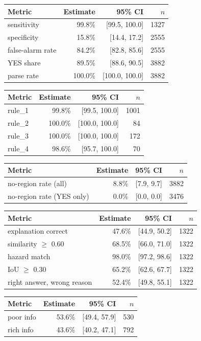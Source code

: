 \begin{tabular}{lrrr}
\toprule
Metric & Estimate & 95\% CI & $n$ \\
\midrule
sensitivity & 99.8\% & [99.5, 100.0] & 1327 \\
specificity & 15.8\% & [14.4, 17.2] & 2555 \\
false-alarm rate & 84.2\% & [82.8, 85.6] & 2555 \\
YES share & 89.5\% & [88.6, 90.5] & 3882 \\
parse rate & 100.0\% & [100.0, 100.0] & 3882 \\
\bottomrule
\end{tabular}

\begin{tabular}{lrrr}
\toprule
Metric & Estimate & 95\% CI & $n$ \\
\midrule
rule\_1 & 99.8\% & [99.5, 100.0] & 1001 \\
rule\_2 & 100.0\% & [100.0, 100.0] & 84 \\
rule\_3 & 100.0\% & [100.0, 100.0] & 172 \\
rule\_4 & 98.6\% & [95.7, 100.0] & 70 \\
\bottomrule
\end{tabular}

\begin{tabular}{lrrr}
\toprule
Metric & Estimate & 95\% CI & $n$ \\
\midrule
no-region rate (all) & 8.8\% & [7.9, 9.7] & 3882 \\
no-region rate (YES only) & 0.0\% & [0.0, 0.0] & 3476 \\
\bottomrule
\end{tabular}

\begin{tabular}{lrrr}
\toprule
Metric & Estimate & 95\% CI & $n$ \\
\midrule
explanation correct & 47.6\% & [44.9, 50.2] & 1322 \\
similarity $\geq$ 0.60 & 68.5\% & [66.0, 71.0] & 1322 \\
hazard match & 98.0\% & [97.2, 98.6] & 1322 \\
IoU $\geq$ 0.30 & 65.2\% & [62.6, 67.7] & 1322 \\
right answer, wrong reason & 52.4\% & [49.8, 55.1] & 1322 \\
\bottomrule
\end{tabular}

\begin{tabular}{lrrr}
\toprule
Metric & Estimate & 95\% CI & $n$ \\
\midrule
poor info & 53.6\% & [49.4, 57.9] & 530 \\
rich info & 43.6\% & [40.2, 47.1] & 792 \\
\bottomrule
\end{tabular}

